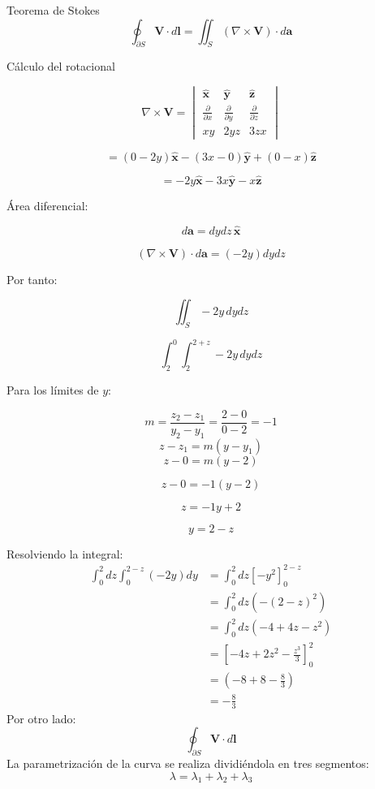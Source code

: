 \documentclass{article}
\begin{document}
Teorema de Stokes
\[
\oint_{\partial S} \mathbf{V} \cdot d\mathbf{l} = \iint_{S} (\nabla \times \mathbf{V}) \cdot d\mathbf{a}
\]

Cálculo del rotacional

\[
\nabla \times \mathbf{V} =
\begin{vmatrix}
\hat{\mathbf{x}} & \hat{\mathbf{y}} & \hat{\mathbf{z}} \\
\frac{\partial}{\partial x} & \frac{\partial}{\partial y} & \frac{\partial}{\partial z} \\
xy & 2yz & 3zx
\end{vmatrix}
\]

\[
= (0 - 2y) \hat{\mathbf{x}} - (3x - 0) \hat{\mathbf{y}} + (0 - x) \hat{\mathbf{z}}
\]

\[
= -2y \hat{\mathbf{x}} - 3x \hat{\mathbf{y}} - x \hat{\mathbf{z}}
\]

Área diferencial:

\[
d\mathbf{a} = dy dz \, \hat{\mathbf{x}}
\]

\[
(\nabla \times \mathbf{V}) \cdot d\mathbf{a} = (-2y) dy dz
\]

Por tanto:

\[
\iint_S -2y \, dy dz
\]

\[
\int_2^0 \int_2^{2+z} -2y \, dy dz
\]

Para los límites de \( y \):

\[
m = \frac{z_2 - z_1}{y_2 - y_1} = \frac{2 - 0}{0 - 2} = -1
\]
\[
 z- z_1=m({y - y_1} )
\]
\[
z - 0 = m(y - 2)
\]

\[
z - 0 = -1(y - 2)
\]

\[
z = -1y + 2
\]

\[
y = 2 - z
\]

Resolviendo la integral:
\begin{align*}
    \int_0^2 dz \int_0^{2-z} (-2y) dy &= \int_0^2 dz \left[ -y^2 \right]_0^{2-z} \\
    &= \int_0^2 dz \left( - (2-z)^2 \right) \\
    &= \int_0^2 dz (-4 + 4z - z^2) \\
    &= \left[ -4z + 2z^2 - \frac{z^3}{3} \right]_0^2 \\
    &= \left( -8 + 8 - \frac{8}{3} \right) \\
    &=\boxed{ -\frac{8}{3}}
\end{align*}
Por otro lado:
\[
\oint_{\partial S} \mathbf{V} \cdot d\mathbf{l} 
\] 
La parametrización de la curva se realiza dividiéndola en tres segmentos:
\[
\lambda = \lambda_1 + \lambda_2 + \lambda_3
\]
\end{document}
